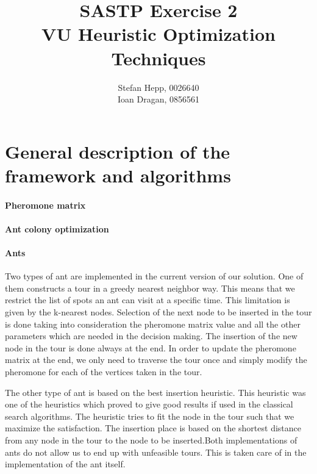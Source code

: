 \documentclass{article}
\title{SASTP Exercise 2\\
{VU Heuristic Optimization Techniques} }
\author{Stefan Hepp, 0026640 \\
Ioan Dragan, 0856561 }
\begin{document}
\maketitle
\section{General description of the framework and algorithms}

\paragraph{Pheromone matrix}

\paragraph{Ant colony optimization}

\paragraph{Ants}

Two types of ant are implemented in the current version of our solution. One of them constructs a tour in a greedy nearest neighbor way. This means that we restrict the list of spots an ant can visit at a specific time. This limitation is given by the k-nearest nodes. Selection of the next node to be inserted in the tour is done taking into consideration the pheromone matrix value and all the other parameters which are needed in the decision making. The insertion of the new node in the tour is done always at the end. In order to update the pheromone matrix at the end, we only need to traverse the tour once and simply modify the pheromone for each of the vertices taken in the tour.

The other type of ant is based on the best insertion heuristic. This heuristic was one of the heuristics which proved to give good results if used in the classical search algorithms. The heuristic tries to fit the node in the tour such that we maximize the satisfaction. The insertion place is based on the shortest distance from any node in the tour to the node to be inserted.Both implementations of ants do not allow us to end up with unfeasible tours. This is taken care of in the implementation of the ant itself. 




\end{document}
